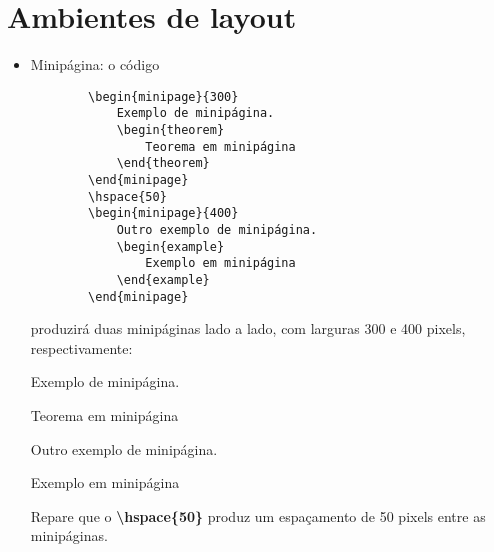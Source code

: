 

\newcommand{\com}[1]{\textbf{\backslash#1}}
\newcommand{\comp}[2]{\textbf{\backslash#1\{#2\}}}
\newcommand{\compp}[3]{\textbf{\backslash#1\{#2\}\{#3\}}}
\newcommand{\comop}[3]{\textbf{\backslash#1[#2]\{#3\}}}

\section{Ambientes de layout}

\begin{itemize}
    \item Minipágina: o código
    \begin{verbatim}
        \begin{minipage}{300}
            Exemplo de minipágina.
            \begin{theorem}
                Teorema em minipágina
            \end{theorem}
        \end{minipage}
        \hspace{50}
        \begin{minipage}{400}
            Outro exemplo de minipágina.
            \begin{example}
                Exemplo em minipágina
            \end{example}
        \end{minipage}\end{verbatim}
    produzirá duas minipáginas lado a lado, com larguras 300 e 400 pixels, respectivamente:
    \begin{minipage}{300}
        Exemplo de minipágina.
        \begin{theorem}
            Teorema em minipágina
        \end{theorem}
    \end{minipage}
    \hspace{50}
    \begin{minipage}{400}
        Outro exemplo de minipágina.
        \begin{example}
            Exemplo em minipágina
        \end{example}
    \end{minipage}

    Repare que o \comp{hspace}{50} produz um espaçamento de 50 pixels entre as minipáginas.
\end{itemize}
